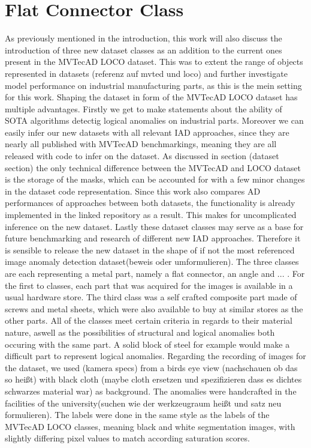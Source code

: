 \section{Flat Connector Class}
\label{sec:ourdata}
As previously mentioned in the introduction, this work will also discuss the introduction of three new dataset classes as an addition to the current ones present in the MVTecAD LOCO dataset.
This was to extent the range of objects represented in datasets (referenz auf mvted und loco) and further investigate model performance on industrial manufacturing parts, as this is the 
mein setting for this work. Shaping the dataset in form of the MVTecAD LOCO dataset has multiple advantages. Firstly we get to make statements about the ability of SOTA algorithms detectig 
logical anomalies on industrial parts. Moreover we can easily infer our new datasets with all relevant IAD approaches, since they are nearly all published with MVTecAD benchmarkings, meaning 
they are all released with code to infer on the dataset. As discussed in section (dataset section) the only technical difference between the MVTecAD and LOCO dataset is the storage of the masks, 
which can be accounted for with a few minor changes in the dataset code representation. Since this work also compares AD performances of approaches between both datasets, the functionality 
is already implemented in the linked repository as a result. This makes for uncomplicated inference on the new dataset. Lastly these dataset classes may serve as a base for future benchmarking 
and research of different new IAD approaches. Therefore it is sensible to release the new dataset in the shape of if not the most referenced image anomaly detection dataset(beweis oder umformulieren). 
The three classes are each representing a metal part, namely a flat connector, an angle and ... . For the first to classes, each part that was acquired for the images is available in a 
usual hardware store. The third class was a self crafted composite part made of screws and metal sheets, which were also available to buy at similar stores as the other parts. All of the classes 
meet certain criteria in regards to their material nature, aswell as the possibilities of structural and logical anomalies both occuring with the same part. A solid block of steel for example 
would make a difficult part to represent logical anomalies.
Regarding the recording of images for the dataset, we used (kamera specs) from a birds eye view (nachschauen ob das so heißt) with black cloth (maybe cloth ersetzen und spezifizieren dass es 
dichtes schwarzes material war) as background. The anomalies were handcrafted in the facilities of the university(suchen wie der werkzeugraum heißt und satz neu formulieren). The labels 
were done in the same style as the labels of the MVTecAD LOCO classes, meaning black and white segmentation images, with slightly differing pixel values to match according saturation scores. 

